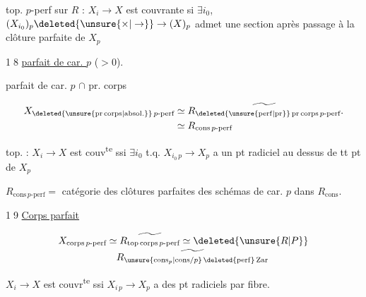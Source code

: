 top. $p$-perf sur $R$ : $X_i\longrightarrow X$ est couvrante si $\exists i_0$, $(X_{i_0})_p\deleted{\ensuremath{\unsure{\times|\to}}}\to(X)_p$ admet une section après passage à la clôture parfaite de $X_p$

\textcircled{18} \uline{  parfait de car. $p$} ($>0$).

parfait de car. $p$ $\cap$ pr. corps

\[
\begin{aligned}
 X_{\deleted{\ensuremath{\unsure{\mathrm{pr\,corps}|\mathrm{absol.}}}}\,p\text{-perf}}
 &\simeq \widetilde{R_{\deleted{\ensuremath{\unsure{\mathrm{perf}|\mathrm{pr}}}}\,\mathrm{pr\,corps}\,p\text{-perf}}}.\\
 &\simeq R_{\mathrm{cons}\,p\text{-perf}}
\end{aligned}
\]

top.  : $X_i\to X$ est couv\textsuperscript{te} ssi $\exists i_0$ t.q. $X_{i_0\,p}\longrightarrow X_p$ a un pt radiciel au dessus de tt pt de $X_p$

$R_{\mathrm{cons}\,p\text{-perf}}=$ catégorie des clôtures parfaites des schémas de car. $p$ dans $R_{\mathrm{cons}}$.

\textcircled{19} \uline{Corps parfait}  

\[
\begin{aligned}
 X_{\mathrm{corps}\,p\text{-perf}}&\simeq
 \widetilde{R_{\mathrm{top\,corps}\,p\text{-perf}}}\simeq\deleted{\ensuremath{\unsure{R|P}}}\\[-2pt]
 &\hspace{1em}\widetilde{R_{\unsure{\mathrm{cons}_p|\mathrm{cons}/p}\,\deleted{\ensuremath{\mathrm{perf}}}\,\mathrm{Zar}}}
\end{aligned}
\]

$X_i\longrightarrow X$ est couvr\textsuperscript{te} ssi $X_{i\,p}\to X_p$ a des pt radiciels  par fibre.





